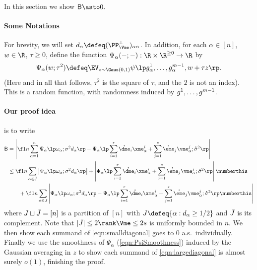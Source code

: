 \documentclass[main.tex]{subfiles}
\begin{document}
In this section we show  $\probB \asto 0.$

\paragraph{Some Notations}
For brevity, we will set $d_\alpha \defeq (\PP^\perp_{\Vme})_{\alpha\alpha}$.
In addition, for each $\alpha \in [n]$, $w \in \R$, $\tau \ge 0$, define the function $\Psi_\alpha(-; -): \R \times \R^{\ge 0} \to \R$ by
\[\Psi_\alpha(w; \tau^2) \defeq
            \EV_{z\sim\Gaus(0, 1)}
            \psi\lp
                g^1_\alpha, \ldots, g^{\MM-1}_\alpha, w + \tau z
                \rp.
\]
(Here and in all that follows, $\tau^2$ is the square of $\tau$, and the $2$ is not an index).
This is a random function, with randomness induced by $g^1, \ldots, g^{m-1}$.

\paragraph{Our proof idea} is to write
\begin{align*}
\probB
    &=
        \left| \f 1 n \sum_{\alpha=1}^n
            \Psi_\alpha\lp \omega_\alpha; \sigma^2 d_\alpha \rp
            -
            \Psi_\alpha\lp
              \sum_{i=1}^r \mathring {\dme}_i \xme^i_\alpha +
                \sum_{j=1}^s \mathring {\eme}_j \vme^j_\alpha
              ; \mathring \sigma^2 \rp
        \right|
        \\
    &\le
        \f 1 n
        \sum_{\alpha\in \JJ}
        \left|\Psi_\alpha\lp \omega_\alpha; \sigma^2 d_\alpha\rp\right|
        +
        \left|\Psi_\alpha\lp
              \sum_{i=1}^r \mathring {\dme}_i \xme^i_\alpha +
                \sum_{j=1}^s \mathring {\eme}_j \vme^j_\alpha
                ;
                \mathring \sigma^2
              \rp
        \right|
        \numberthis \label{eqn:smalldiagonal}
        \\
    &\qquad
        +
        \f 1 n \sum_{\alpha\in \JJc}
        \left|
        \Psi_\alpha\lp \omega_\alpha; \sigma^2 d_\alpha\rp
        -
        \Psi_\alpha\lp
              \sum_{i=1}^r \mathring {\dme}_i \xme^i_\alpha +
                \sum_{j=1}^s \mathring {\eme}_j \vme^j_\alpha
                ; \mathring \sigma^2
              \rp
        \numberthis \label{eqn:largediagonal}
        \right|
\end{align*}
where $J \sqcup \bar{J} = [n]$ is a partition of $[n]$ with $\JJc \defeq \{\alpha: d_\alpha \ge 1/2\}$ and $\bar{J}$ is its complement.
Note that $|\JJ| \le 2 \rank \Vme \le 2 s$ is uniformly bounded in $n$.
We then show each summand of \cref{eqn:smalldiagonal} goes to 0 a.s.\ individually.
Finally we use the smoothness of $\Psi_\alpha$ (\cref{eqn:PsiSmoothness}) induced by the Gaussian averaging in $z$ to show each summand of \cref{eqn:largediagonal} is almost surely $o(1)$, finishing the proof.
\end{document}
